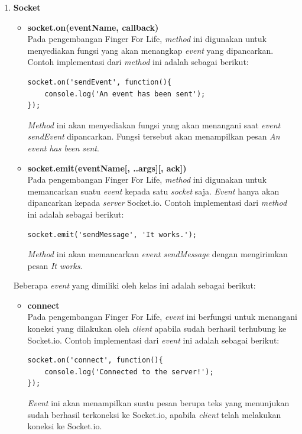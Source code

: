 \begin{enumerate}
\begin{enumerate}
\begin{enumerate}
			\item \textbf{Socket}
			\begin{itemize}
				\item \textbf{socket.on(eventName, callback)} \\
				Pada pengembangan Finger For Life, \textit{method} ini digunakan untuk menyediakan fungsi yang akan menangkap \textit{event} yang dipancarkan. Contoh implementasi dari \textit{method} ini adalah sebagai berikut:
\begin{lstlisting}[caption={Implementasi \textit{method .on()} pada \textit{client} }]
socket.on('sendEvent', function(){
	console.log('An event has been sent');
});
\end{lstlisting}
\textit{Method} ini akan menyediakan fungsi yang akan menangani saat \textit{event sendEvent} dipancarkan. Fungsi tersebut akan menampilkan pesan \textit{An event has been sent}.
				
				\item \textbf{socket.emit(eventName[, ..args][, ack])} \\
				Pada pengembangan Finger For Life, \textit{method} ini digunakan untuk memancarkan suatu \textit{event} kepada satu \textit{socket} saja. \textit{Event} hanya akan dipancarkan kepada \textit{server} Socket.io. Contoh implementasi dari \textit{method} ini adalah sebagai berikut:
\begin{lstlisting}[caption={Implementasi \textit{method emit()} pada \textit{client} }]
socket.emit('sendMessage', 'It works.');
\end{lstlisting}
\textit{Method} ini akan memancarkan \textit{event sendMessage} dengan mengirimkan pesan \textit{It works}.
			\end{itemize}
			
			Beberapa \textit{event} yang dimiliki oleh kelas ini adalah sebagai berikut:
			\begin{itemize}
				\item \textbf{connect} \\
				Pada pengembangan Finger For Life, \textit{event} ini berfungsi untuk menangani koneksi yang dilakukan oleh \textit{client} apabila sudah berhasil terhubung ke Socket.io. Contoh implementasi dari \textit{event} ini adalah sebagai berikut:
\begin{lstlisting}[caption={Implementasi \textit{event connect} pada \textit{client} }]
socket.on('connect', function(){
	console.log('Connected to the server!');
});
\end{lstlisting}
				\textit{Event} ini akan menampilkan suatu pesan berupa teks yang menunjukan sudah berhasil terkoneksi ke Socket.io, apabila \textit{client} telah melakukan koneksi ke Socket.io.


\end{itemize}
\end{enumerate}
\end{enumerate}
\end{enumerate}
